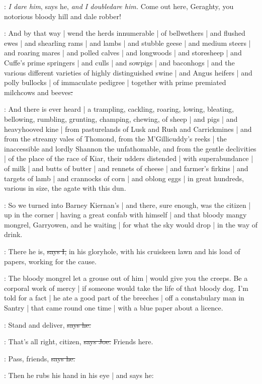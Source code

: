 \Nq:
\emph{I dare him},
says he,
\emph{and I doubledare him.}
Come out here,
Geraghty,
you notorious bloody hill and dale robber!

:
And by that way |
wend the herds innumerable |
of bellwethers |
and flushed ewes |
and shearling rams |
and lambs |
and stubble geese |
and medium steers |
and roaring mares |
and polled calves |
and longwoods |
and storesheep |
and Cuffe's prime springers |
and culls |
and sowpigs |
and baconhogs |
and the various different varieties of highly distinguished swine |
and Angus heifers |
and polly bullocks |
of immaculate pedigree |
together with prime premiated milchcows and beeves\sout{:}

:
And there is ever heard |
a trampling,
cackling,
roaring,
lowing,
bleating,
bellowing,
rumbling,
grunting,
champing,
chewing,
of sheep |
and pigs |
and heavyhooved kine |
from pasturelands of Lusk and Rush and Carrickmines |
and from the streamy vales of Thomond,
from the M'Gillicuddy's reeks |
the inaccessible and lordly Shannon the unfathomable,
and from the gentle declivities |
of the place of the race of Kiar,
their udders distended |
with superabundance |
of milk |
and butts of butter |
and rennets of cheese |
and farmer's firkins |
and targets of lamb |
and crannocks of corn |
and oblong eggs |
in great hundreds,
various in size,
the agate with this dun.

\Nq:
So we turned into Barney Kiernan's |
and there,
sure enough,
was the citizen |
up in the corner |
having a great confab with himself |
and that bloody mangy mongrel,
Garryowen,
and he waiting |
for what the sky would drop |
in the way of drink.

:
There he is,
\sout{says I,}
in his gloryhole,
with his cruiskeen lawn and his load of papers,
working for the cause.

\Nq:
The bloody mongrel let a grouse out of him |
would give you the creeps.
Be a corporal work of mercy |
if someone would take the life of that bloody dog.
I'm told for a fact |
he ate a good part of the breeches |
off a constabulary man in Santry |
that came round one time |
with a blue paper about a licence.

\citizen:
Stand and deliver,
\sout{says he.}

\joe:
That's all right,
citizen,
\sout{says Joe.}
Friends here.

\citizen:
Pass,
friends,
\sout{says he.}

\Nq:
Then he rubs his hand in his eye |
and says he:

